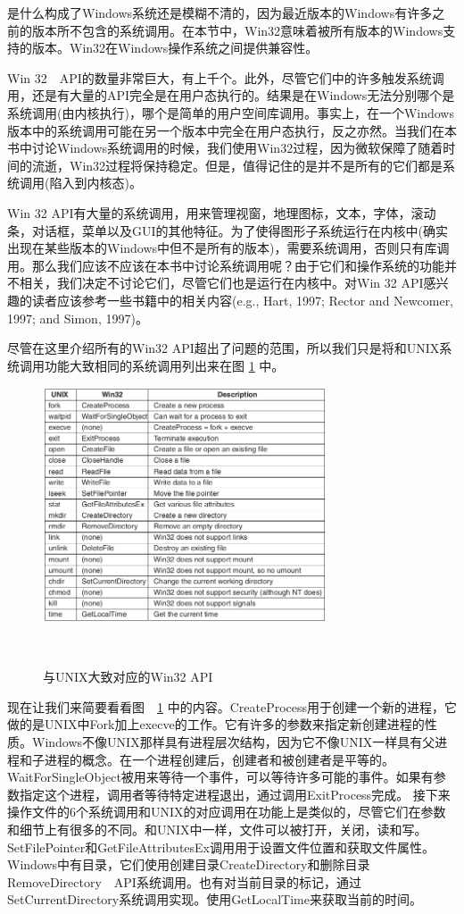 	是什么构成了Windows系统还是模糊不清的，因为最近版本的Windows有许多之前的版本所不包含的系统调用。在本节中，Win32意味着被所有版本的Windows支持的版本。Win32在Windows操作系统之间提供兼容性。
	
	Win 32　API的数量非常巨大，有上千个。此外，尽管它们中的许多触发系统调用，还是有大量的API完全是在用户态执行的。结果是在Windows无法分别哪个是系统调用(由内核执行)，哪个是简单的用户空间库调用。事实上，在一个Windows版本中的系统调用可能在另一个版本中完全在用户态执行，反之亦然。当我们在本书中讨论Windows系统调用的时候，我们使用Win32过程，因为微软保障了随着时间的流逝，Win32过程将保持稳定。但是，值得记住的是并不是所有的它们都是系统调用(陷入到内核态)。
	
    Win 32 API有大量的系统调用，用来管理视窗，地理图标，文本，字体，滚动条，对话框，菜单以及GUI的其他特征。为了使得图形子系统运行在内核中(确实出现在某些版本的Windows中但不是所有的版本)，需要系统调用，否则只有库调用。那么我们应该不应该在本书中讨论系统调用呢？由于它们和操作系统的功能并不相关，我们决定不讨论它们，尽管它们也是运行在内核中。对Win 32 API感兴趣的读者应该参考一些书籍中的相关内容(e.g., Hart, 1997; Rector and Newcomer, 1997; and Simon, 1997)。
    
   	尽管在这里介绍所有的Win32 API超出了问题的范围，所以我们只是将和UNIX系统调用功能大致相同的系统调用列出来在图 \ref{fig:win32APIs} 中。
   	
   	\begin{figure}[ht]\small
   		\centering
   		\includegraphics[width=0.75\textwidth]{FIG/1-23.png}
   		\caption{与UNIX大致对应的Win32 API}　\label{fig:win32APIs}
   	\end{figure}
   
   现在让我们来简要看看图　\ref{fig:win32APIs} 中的内容。CreateProcess用于创建一个新的进程，它做的是UNIX中Fork加上execve的工作。它有许多的参数来指定新创建进程的性质。Windows不像UNIX那样具有进程层次结构，因为它不像UNIX一样具有父进程和子进程的概念。在一个进程创建后，创建者和被创建者是平等的。WaitForSingleObject被用来等待一个事件，可以等待许多可能的事件。如果有参数指定这个进程，调用者等待特定进程退出，通过调用ExitProcess完成。
   接下来操作文件的6个系统调用和UNIX的对应调用在功能上是类似的，尽管它们在参数和细节上有很多的不同。和UNIX中一样，文件可以被打开，关闭，读和写。SetFilePointer和GetFileAttributesEx调用用于设置文件位置和获取文件属性。
   Windows中有目录，它们使用创建目录CreateDirectory和删除目录RemoveDirectory　API系统调用。也有对当前目录的标记，通过SetCurrentDirectory系统调用实现。使用GetLocalTime来获取当前的时间。
   
